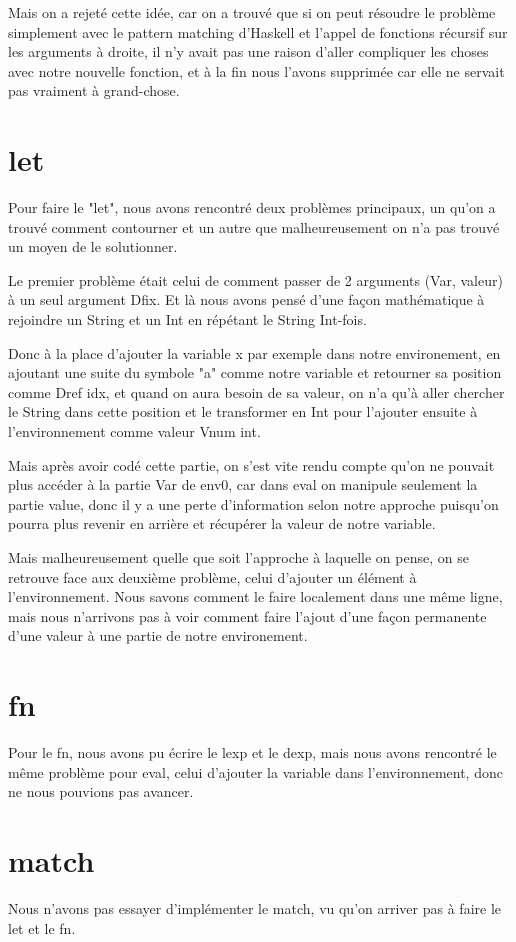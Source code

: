 \documentclass{article}
\begin{document}
Mais on a rejeté cette idée, car on a trouvé que si on peut résoudre le problème simplement avec le pattern matching d'Haskell et l'appel de fonctions récursif sur les arguments à droite, il n'y avait pas une raison d'aller compliquer les choses avec notre nouvelle fonction, et à la fin nous l'avons supprimée car elle ne servait pas vraiment à grand-chose.

\section{let}

Pour faire le "let", nous avons rencontré deux problèmes principaux, un qu'on a trouvé comment contourner et un autre que malheureusement on n'a pas trouvé un moyen de le solutionner.

Le premier problème était celui de comment passer de 2 arguments (Var, valeur) à un seul argument Dfix.
Et là nous avons pensé d'une façon mathématique à rejoindre un String et un Int en répétant le String Int-fois.

Donc à la place d'ajouter la variable x par exemple dans notre environement, en ajoutant une suite du symbole "a" comme notre variable et retourner sa position comme Dref idx, et quand on aura besoin de sa valeur, on n'a qu'à aller chercher le String dans cette position et le transformer en Int pour l'ajouter ensuite à l'environnement comme valeur Vnum int.

Mais après avoir codé cette partie, on s'est vite rendu compte qu'on ne pouvait plus accéder à la partie  Var de env0, car dans eval on manipule seulement la partie value, donc il y a une perte d'information selon notre approche puisqu'on pourra plus revenir en arrière et récupérer la valeur de notre variable.

Mais malheureusement quelle que soit l'approche à laquelle on pense, on se retrouve face aux deuxième problème, celui d'ajouter un élément à l'environnement. Nous savons comment le faire localement dans une même ligne, mais nous n'arrivons pas à voir comment faire l'ajout d'une façon permanente d'une valeur à une partie de notre environement.


\section{fn}

Pour le fn, nous avons pu écrire le lexp et le dexp, mais nous avons rencontré le même problème pour eval, celui d'ajouter la variable dans l'environnement, donc ne nous pouvions pas avancer.
\section{match}

Nous n'avons pas essayer d'implémenter le match, vu qu'on arriver pas à faire le let et le fn.
\end{document}
